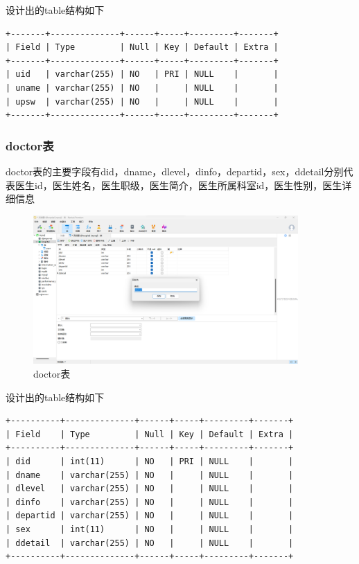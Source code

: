 \documentclass[UTF8,12pt]{article}
\begin{document}
设计出的table结构如下

\begin{lstlisting}[frame=shadowbox]
+-------+--------------+------+-----+---------+-------+
| Field | Type         | Null | Key | Default | Extra |
+-------+--------------+------+-----+---------+-------+
| uid   | varchar(255) | NO   | PRI | NULL    |       |
| uname | varchar(255) | NO   |     | NULL    |       |
| upsw  | varchar(255) | NO   |     | NULL    |       |
+-------+--------------+------+-----+---------+-------+
\end{lstlisting}

\subsubsection{doctor表}

doctor表的主要字段有did，dname，dlevel，dinfo，departid，sex，ddetail分别代表医生id，医生姓名，医生职级，医生简介，医生所属科室id，医生性别，医生详细信息

\newpage

\begin{figure}[htbp]
    \centering
    \includegraphics[width=0.9\textwidth]{imgs/6.png}
    \caption{doctor表}
\end{figure}

设计出的table结构如下

\begin{lstlisting}[frame=shadowbox]
+----------+--------------+------+-----+---------+-------+
| Field    | Type         | Null | Key | Default | Extra |
+----------+--------------+------+-----+---------+-------+
| did      | int(11)      | NO   | PRI | NULL    |       |
| dname    | varchar(255) | NO   |     | NULL    |       |
| dlevel   | varchar(255) | NO   |     | NULL    |       |
| dinfo    | varchar(255) | NO   |     | NULL    |       |
| departid | varchar(255) | NO   |     | NULL    |       |
| sex      | int(11)      | NO   |     | NULL    |       |
| ddetail  | varchar(255) | NO   |     | NULL    |       |
+----------+--------------+------+-----+---------+-------+
\end{lstlisting}
\end{document}
